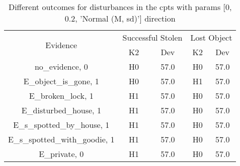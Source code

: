 \begin{table}\begin{tabular}{c|cc|cc}\toprule\multirow{2}{*}{Evidence} & \multicolumn{2}{c}{Successful Stolen} & \multicolumn{2}{c}{Lost Object} \\& {K2} & {Dev} & {K2} & {Dev} \\\midrule
no\_evidence, 0 & \cellcolor{Bittersweet}H0&\cellcolor{Bittersweet}57.0&\cellcolor{Bittersweet}H0&\cellcolor{Bittersweet}57.0\\E\_object\_is\_gone, 1 & \cellcolor{Bittersweet}H0&\cellcolor{Bittersweet}57.0&\cellcolor{Bittersweet}H1&\cellcolor{Bittersweet}57.0\\E\_broken\_lock, 1 & \cellcolor{Bittersweet}H1&\cellcolor{Bittersweet}57.0&\cellcolor{Bittersweet}H0&\cellcolor{Bittersweet}57.0\\E\_disturbed\_house, 1 & \cellcolor{Bittersweet}H1&\cellcolor{Bittersweet}57.0&\cellcolor{Bittersweet}H0&\cellcolor{Bittersweet}57.0\\E\_s\_spotted\_by\_house, 1 & \cellcolor{Bittersweet}H1&\cellcolor{Bittersweet}57.0&\cellcolor{Bittersweet}H0&\cellcolor{Bittersweet}57.0\\E\_s\_spotted\_with\_goodie, 1 & \cellcolor{Bittersweet}H1&\cellcolor{Bittersweet}57.0&\cellcolor{Bittersweet}H0&\cellcolor{Bittersweet}57.0\\E\_private, 0 & \cellcolor{Bittersweet}H1&\cellcolor{Bittersweet}57.0&\cellcolor{Bittersweet}H0&\cellcolor{Bittersweet}57.0\\\bottomrule\end{tabular}\caption{Different outcomes for disturbances in the cpts with params [0, 0.2, 'Normal (M, sd)'] direction}\end{table}